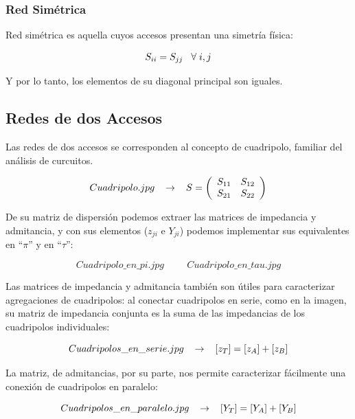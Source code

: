 \documentclass[12pt]{article}
\begin{document}
\subsubsection{Red Sim\'etrica}

Red sim\'etrica es aquella cuyos accesos presentan una simetr\'ia f\'isica:

$$S_{ii} =S_{jj} \hspace{0.3cm} \forall \hspace{0.1cm} i,j$$

Y por lo tanto, los elementos de su diagonal principal son iguales.

\subsection{Redes de dos Accesos}

Las redes de dos accesos se corresponden al concepto de cuadripolo, familiar del an\'alisis de curcuitos.

$$Cuadripolo.jpg \hspace{0.3cm} \rightarrow \hspace{0.3cm} S =\left(\begin{array}{cc}
	S_{11} & S_{12}\\
	S_{21} & S_{22}
\end{array}\right)$$

De su matriz de dispersi\'on podemos extraer las matrices de impedancia y admitancia, y con sus elementos ($z_{ji}$ e $Y_{ji}$) podemos implementar sus equivalentes en ``$\pi$'' y en ``$\tau$'':

$$Cuadripolo\_en\_pi.jpg \hspace{1cm} Cuadripolo\_en\_tau.jpg$$

Las matrices de impedancia y admitancia tambi\'en son \'utiles para caracterizar agregaciones de cuadripolos: al conectar cuadripolos en serie, como en la imagen, su matriz de impedancia conjunta es la suma de las impedancias de los cuadripolos individuales:

$$Cuadripolos\_en\_serie.jpg \hspace{0.3cm} \rightarrow \hspace{0.3cm} [z_T] = [z_A] + [z_B]$$

La matriz, de admitancias, por su parte, nos permite caracterizar f\'acilmente una conexi\'on de cuadripolos en paralelo:

$$Cuadripolos\_en\_paralelo.jpg \hspace{0.3cm} \rightarrow \hspace{0.3cm} [Y_T] = [Y_A] + [Y_B]$$
\end{document}

